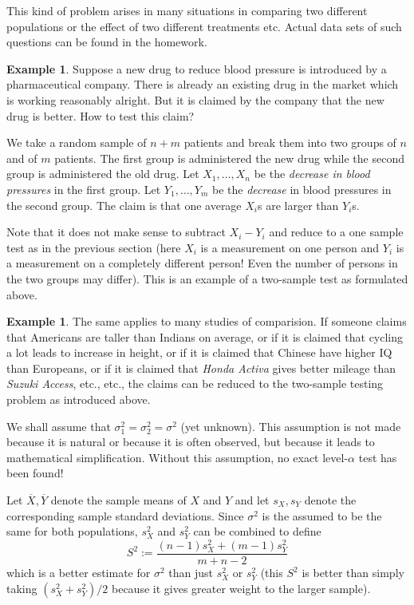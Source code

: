 \documentclass[preprint,  11pt]{amsart}
\newcommand{\para}[1]{\vspace{4mm}\noindent{\bfseries #1:}}
\newcommand{\parag}[1]{\vspace{4mm}\noindent{\bfseries #1}}
\theoremstyle{plain} %
\theoremstyle{definition} %
\newtheorem{example}[theorem]{Example}
\begin{document}
This kind of problem arises in many situations in comparing two different populations or the effect of two different treatments etc. Actual data sets of such questions can be found in the homework.
\begin{example} Suppose a new drug to reduce blood pressure is introduced by a pharmaceutical company.  There is already an existing drug in the market which is working reasonably alright. But it is claimed by the company that the new drug is better. How to test this claim?

We take a random sample of $n+m$ patients and break them into two groups of $n$ and of $m$ patients. The first group is administered the new drug while the second group is administered the old drug. Let $X_{1},\ldots ,X_{n}$ be the {\em decrease in blood pressures} in the first group. Let $Y_{1},\ldots ,Y_{m}$ be the {\em decrease} in blood pressures in the second group. The claim is that one average $X_{i}$s are larger than $Y_{i}$s.

Note that it does not make sense to subtract $X_{i}-Y_{i}$ and reduce to a one sample test as in the previous section (here $X_{i}$ is a measurement on one person and $Y_{i}$ is a measurement on a completely different person! Even the number of persons in the two groups may differ). This is an example of a two-sample test as formulated above. 
\end{example}
\begin{example} The same applies to many studies of comparision. If someone claims that Americans are taller than Indians on average, or if it is claimed that cycling a lot leads to increase in height, or if it is claimed that Chinese have higher IQ than Europeans, or if it is claimed that {\em Honda Activa} gives better mileage than {\em Suzuki Access}, etc., etc., the claims can be reduced to the two-sample testing problem as introduced above.
\end{example}

\parag{BIG ASSUMPTION:} We shall assume that ${\sigma}_{1}^{2}={\sigma}_{2}^{2}={\sigma}^{2}$ (yet unknown). This assumption is not made because it is natural or because it is often observed, but because it leads to mathematical simplification. Without this assumption, no exact level-$\alpha$ test has been found!

\para{The test} Let $\overline{X},\overline{Y}$ denote the sample means of $X$ and $Y$ and let $s_{X}, s_{Y}$ denote the corresponding sample standard deviations. Since ${\sigma}^{2}$ is the assumed to be the same for both populations, $s_{X}^{2}$ and $s_{Y}^{2}$ can be combined to define 
$$
S^{2}:=\frac{(n-1)s_{X}^{2}+(m-1)s_{Y}^{2}}{m+n-2}
$$
which is a better estimate for ${\sigma}^{2}$ than just $s_{X}^{2}$ or $s_{Y}^{2}$ (this $S^{2}$ is better than simply taking $(s_{X}^{2}+s_{Y}^{2})/2$ because it gives greater weight to the larger sample). 
\end{document}

